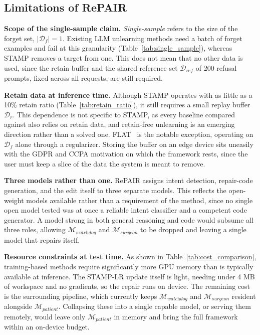 \subsection{Limitations of RePAIR}

\noindent
\textbf{Scope of the single-sample claim.} \textit{Single-sample} refers to the size of the forget set, $|\mathcal{D}_f| = 1$. Existing LLM unlearning methods need a batch of forget examples and fail at this granularity (Table~\ref{tab:single_sample}), whereas STAMP removes a target from one. This does not mean that no other data is used, since the retain buffer and the shared reference set $\mathcal{D}_{\textit{ref}}$ of 200 refusal prompts, fixed across all requests, are still required.

\medskip
\noindent
\textbf{Retain data at inference time.} Although STAMP operates with as little as a 10\% retain ratio (Table~\ref{tab:retain_ratio}), it still requires a small replay buffer $\mathcal{D}_r$. This dependence is not specific to STAMP, as every baseline compared against also relies on retain data, and retain-free unlearning is an emerging direction rather than a solved one. FLAT~\citeauthor{wang2024llm} is the notable exception, operating on $\mathcal{D}_f$ alone through a regularizer. Storing the buffer on an edge device sits uneasily with the GDPR and CCPA motivation on which the framework rests, since the user must keep a slice of the data the system is meant to remove.

\medskip
\noindent
\textbf{Three models rather than one.} RePAIR assigns intent detection, repair-code generation, and the edit itself to three separate models. This reflects the open-weight models available rather than a requirement of the method, since no single open model tested was at once a reliable intent classifier and a competent code generator. A model strong in both general reasoning and code would subsume all three roles, allowing $\mathcal{M}_{\textit{watchdog}}$ and $\mathcal{M}_{\textit{surgeon}}$ to be dropped and leaving a single model that repairs itself.

\medskip
\noindent
\textbf{Resource constraints at test time.} As shown in Table~\ref{tab:cost_comparison}, training-based methods require significantly more GPU memory than is typically available at inference. The STAMP-LR update itself is light, needing under 4 MB of workspace and no gradients, so the repair runs on device. The remaining cost is the surrounding pipeline, which currently keeps $\mathcal{M}_{\textit{watchdog}}$ and $\mathcal{M}_{\textit{surgeon}}$ resident alongside $\mathcal{M}_{\textit{patient}}$. Collapsing these into a single capable model, or serving them remotely, would leave only $\mathcal{M}_{\textit{patient}}$ in memory and bring the full framework within an on-device budget.

